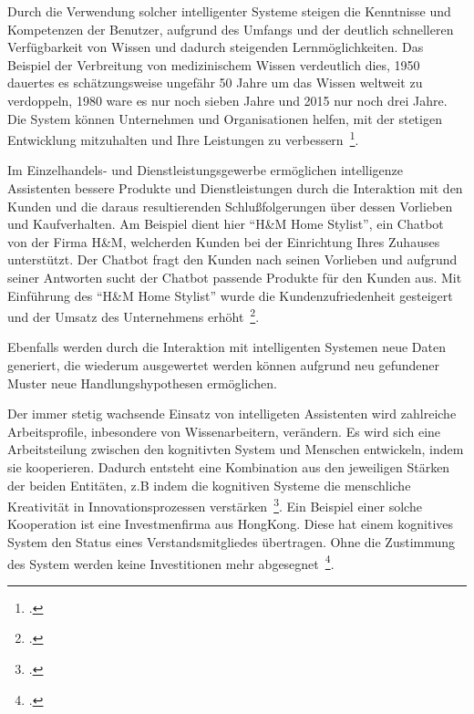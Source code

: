 Durch die Verwendung solcher intelligenter Systeme steigen die Kenntnisse und Kompetenzen der Benutzer, aufgrund des Umfangs und der deutlich schnelleren Verfügbarkeit
von Wissen und dadurch steigenden Lernmöglichkeiten. Das Beispiel der Verbreitung von medizinischem Wissen verdeutlich dies, 1950 
dauertes es schätzungsweise ungefähr 50 Jahre um das Wissen weltweit zu verdoppeln, 1980 ware es nur noch sieben Jahre und 2015 nur noch drei Jahre.
Die System können Unternehmen und Organisationen helfen, mit der stetigen Entwicklung mitzuhalten und Ihre Leistungen zu verbessern~\footcite[\vglf][]{Scherk.2017}.

Im Einzelhandels- und Dienstleistungsgewerbe ermöglichen intelligenze Assistenten bessere Produkte und Dienstleistungen durch die Interaktion mit den Kunden 
und die daraus resultierenden Schlußfolgerungen über dessen Vorlieben und Kaufverhalten.
Am Beispiel dient hier \enquote{H\&M Home Stylist}, ein Chatbot von der Firma H\&M, welcherden Kunden bei der Einrichtung Ihres Zuhauses unterstützt. Der Chatbot 
fragt den Kunden nach seinen Vorlieben und aufgrund seiner Antworten sucht der Chatbot passende Produkte für den Kunden aus. Mit Einführung des \enquote{H\&M Home Stylist}
wurde die Kundenzufriedenheit gesteigert und der Umsatz des Unternehmens erhöht~\footcite[\vglf][]{Robot.2023}.

Ebenfalls werden durch die Interaktion mit intelligenten Systemen neue Daten generiert, die wiederum ausgewertet werden können aufgrund neu gefundener Muster neue Handlungshypothesen
ermöglichen.

Der immer stetig wachsende Einsatz von intelligeten Assistenten wird zahlreiche Arbeitsprofile, inbesondere von Wissenarbeitern, verändern. Es wird sich eine Arbeitsteilung 
zwischen den kognitivten System und Menschen entwickeln, indem sie kooperieren. Dadurch entsteht eine Kombination aus den jeweiligen Stärken der beiden Entitäten, z.B indem
die kognitiven Systeme die menschliche Kreativität in Innovationsprozessen verstärken~\footcite[\vglf][]{Scherk.2017}.
Ein Beispiel einer solche Kooperation ist eine Investmenfirma aus HongKong. Diese hat einem kognitives System den Status eines Verstandsmitgliedes übertragen. Ohne die Zustimmung
des System werden keine Investitionen mehr abgesegnet~\footcite[\vglf][]{Scherk.2017}.

